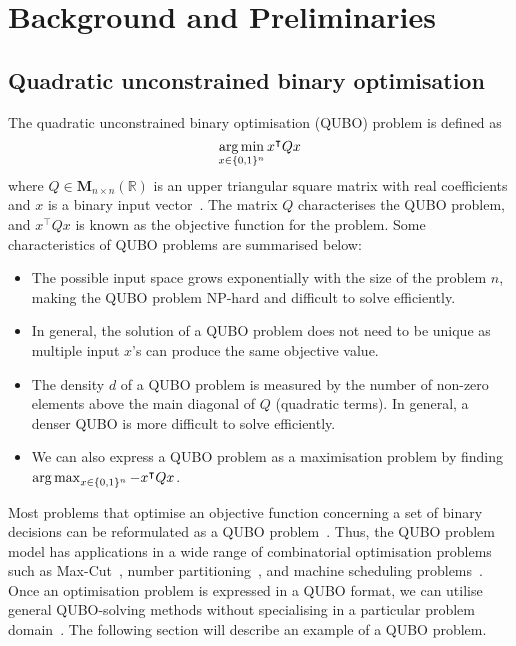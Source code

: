 
\chapter{Background and Preliminaries}
\vspace{2em}

\section{Quadratic unconstrained binary optimisation}
The quadratic unconstrained binary optimisation (QUBO) problem is defined as
\begin{equation} 
\operatorname*{arg\,min}_{x \in \{0, 1\}^n} x^\intercal Q x
\end{equation}
where $Q \in \boldsymbol{M}_{n\times n}(\mathbb{R})$ is an upper triangular square matrix with real coefficients and $x$ is a binary input vector~\cite{b1}. The matrix $Q$ characterises the QUBO problem, and $x^\intercal Q x$ is known as the objective function for the problem. Some characteristics of QUBO problems are summarised below:
\begin{itemize}
    \item The possible input space grows exponentially with the size of the problem $n$, making the QUBO problem NP-hard and difficult to solve efficiently.
    \item In general, the solution of a QUBO problem does not need to be unique as multiple input $x$'s can produce the same objective value.
    \item The density $d$ of a QUBO problem is measured by the number of non-zero elements above the main diagonal of $Q$ (quadratic terms). In general, a denser QUBO is more difficult to solve efficiently. 
    \item We can also express a QUBO problem as a maximisation problem by finding $\operatorname*{arg\,max}_{x \in \{0, 1\}^n} -x^\intercal Q x$.
\end{itemize}

Most problems that optimise an objective function concerning a set of binary decisions can be reformulated as a QUBO problem~\cite{b5}. Thus, the QUBO problem model has applications in a wide range of combinatorial optimisation problems such as Max-Cut~\cite{b2}, number partitioning~\cite{b3}, and machine scheduling problems~\cite{b4}. Once an optimisation problem is expressed in a QUBO format, we can utilise general QUBO-solving methods without specialising in a particular problem domain~\cite{b1}. The following section will describe an example of a QUBO problem.

